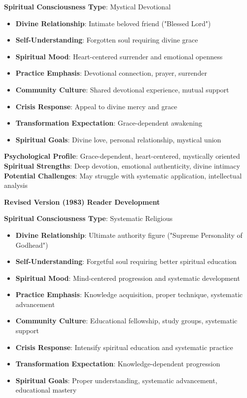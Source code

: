 \documentclass[12pt,twoside]{book}
\begin{document}
\textbf{\textbf{Spiritual Consciousness Type}}: Mystical Devotional
\begin{itemize}
\item \textbf{\textbf{Divine Relationship}}: Intimate beloved friend ("Blessed Lord")
\item \textbf{\textbf{Self-Understanding}}: Forgotten soul requiring divine grace
\item \textbf{\textbf{Spiritual Mood}}: Heart-centered surrender and emotional openness
\item \textbf{\textbf{Practice Emphasis}}: Devotional connection, prayer, surrender
\item \textbf{\textbf{Community Culture}}: Shared devotional experience, mutual support
\item \textbf{\textbf{Crisis Response}}: Appeal to divine mercy and grace
\item \textbf{\textbf{Transformation Expectation}}: Grace-dependent awakening
\item \textbf{\textbf{Spiritual Goals}}: Divine love, personal relationship, mystical union
\end{itemize}

\textbf{\textbf{Psychological Profile}}: Grace-dependent, heart-centered, mystically oriented
\textbf{\textbf{Spiritual Strengths}}: Deep devotion, emotional authenticity, divine intimacy
\textbf{\textbf{Potential Challenges}}: May struggle with systematic application, intellectual analysis

\textbf{\textbf{Revised Version (1983) Reader Development}}

\textbf{\textbf{Spiritual Consciousness Type}}: Systematic Religious  
\begin{itemize}
\item \textbf{\textbf{Divine Relationship}}: Ultimate authority figure ("Supreme Personality of Godhead")
\item \textbf{\textbf{Self-Understanding}}: Forgetful soul requiring better spiritual education
\item \textbf{\textbf{Spiritual Mood}}: Mind-centered progression and systematic development
\item \textbf{\textbf{Practice Emphasis}}: Knowledge acquisition, proper technique, systematic advancement
\item \textbf{\textbf{Community Culture}}: Educational fellowship, study groups, systematic support
\item \textbf{\textbf{Crisis Response}}: Intensify spiritual education and systematic practice
\item \textbf{\textbf{Transformation Expectation}}: Knowledge-dependent progression
\item \textbf{\textbf{Spiritual Goals}}: Proper understanding, systematic advancement, educational mastery
\end{itemize}
\end{document}
